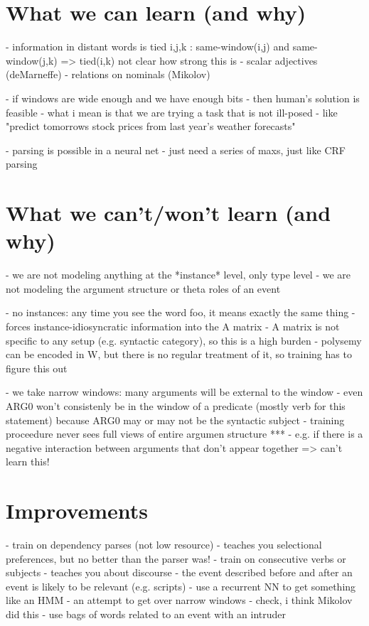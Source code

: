 \documentclass[11pt,letterpaper]{article}
\begin{document}
\section{What we can learn (and why)} %
- information in distant words is tied
	i,j,k : same-window(i,j) and same-window(j,k) => tied(i,k)
	not clear how strong this is
- scalar adjectives (deMarneffe)
- relations on nominals (Mikolov)

- if windows are wide enough and we have enough bits
	- then human's solution is feasible
	- what i mean is that we are trying a task that is not ill-posed
		- like "predict tomorrows stock prices from last year's weather forecasts"

- parsing is possible in a neural net
	- just need a series of maxs, just like CRF parsing


\section{What we can't/won't learn (and why)} %
\label{section:unlearnability}
- we are not modeling anything at the *instance* level, only type level
- we are not modeling the argument structure or theta roles of an event

- no instances: any time you see the word foo, it means exactly the same thing
	- forces instance-idiosyncratic information into the A matrix
	- A matrix is not specific to any setup (e.g. syntactic category), so this is a high burden
	- polysemy can be encoded in W, but there is no regular treatment of it, so training has to figure this out

- we take narrow windows: many arguments will be external to the window
	- even ARG0 won't consistenly be in the window of a predicate (mostly verb for this statement)
		because ARG0 may or may not be the syntactic subject
	- training proceedure never sees full views of entire argumen structure
	***	- e.g. if there is a negative interaction between arguments that don't appear together => can't learn this!


\section{Improvements}
- train on dependency parses (not low resource)
	- teaches you selectional preferences, but no better than the parser was!
- train on consecutive verbs or subjects
	- teaches you about discourse
	- the event described before and after an event is likely to be relevant (e.g. scripts)
- use a recurrent NN to get something like an HMM
	- an attempt to get over narrow windows
	- check, i think Mikolov did this
- use bags of words related to an event with an intruder




{}

\end{document}
